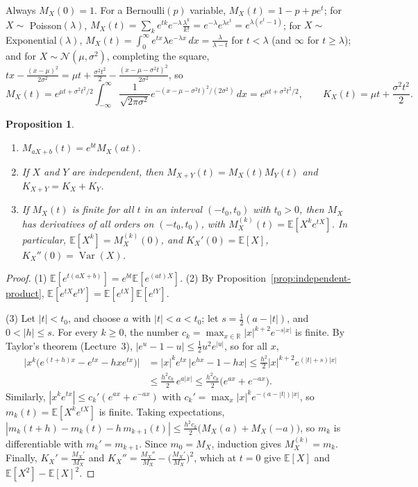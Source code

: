 \documentclass[11pt]{article}
\newcommand{\E}{\mathbb{E}}
\DeclareMathOperator{\Var}{Var}
\theoremstyle{definition}
\theoremstyle{plain}
\newtheorem{proposition}[definition]{Proposition}
\theoremstyle{remark}
\begin{document}
Always $M_X(0) = 1$. For a Bernoulli$(p)$ variable, $M_X(t) = 1 - p + pe^t$; for $X \sim$ Poisson$(\lambda)$, $M_X(t) = \sum_k e^{tk}e^{-\lambda}\frac{\lambda^k}{k!} = e^{-\lambda}e^{\lambda e^t} = e^{\lambda(e^t - 1)}$; for $X \sim$ Exponential$(\lambda)$, $M_X(t) = \int_0^\infty e^{tx}\lambda e^{-\lambda x}\, dx = \frac{\lambda}{\lambda - t}$ for $t < \lambda$ (and $\infty$ for $t \geq \lambda$); and for $X \sim \mathcal{N}(\mu, \sigma^2)$, completing the square, $tx - \frac{(x - \mu)^2}{2\sigma^2} = \mu t + \frac{\sigma^2t^2}{2} - \frac{(x - \mu - \sigma^2t)^2}{2\sigma^2}$, so
\[M_X(t) = e^{\mu t + \sigma^2t^2/2} \int_{-\infty}^\infty \frac{1}{\sqrt{2\pi\sigma^2}}e^{-(x - \mu - \sigma^2t)^2/(2\sigma^2)}\, dx = e^{\mu t + \sigma^2t^2/2}, \qquad K_X(t) = \mu t + \frac{\sigma^2t^2}{2}.\]

\begin{proposition}\label{prop:mgf}
    \begin{enumerate}
        \item $M_{aX + b}(t) = e^{bt}M_X(at)$.
        \item If $X$ and $Y$ are independent, then $M_{X+Y}(t) = M_X(t)M_Y(t)$ and $K_{X+Y} = K_X + K_Y$.
        \item If $M_X(t)$ is finite for all $t$ in an interval $(-t_0, t_0)$ with $t_0 > 0$, then $M_X$ has derivatives of all orders on $(-t_0, t_0)$, with $M_X^{(k)}(t) = \E[X^ke^{tX}]$. In particular, $\E[X^k] = M_X^{(k)}(0)$, and $K_X'(0) = \E[X]$, $K_X''(0) = \Var(X)$.
    \end{enumerate}
\end{proposition}

\begin{proof}
    (1) $\E[e^{t(aX + b)}] = e^{bt}\E[e^{(at)X}]$. (2) By Proposition~\ref{prop:independent-product}, $\E[e^{tX}e^{tY}] = \E[e^{tX}]\E[e^{tY}]$.

    (3) Let $|t| < t_0$, and choose $a$ with $|t| < a < t_0$; let $s = \frac{1}{2}(a - |t|)$, and $0 < |h| \leq s$. For every $k \geq 0$, the number $c_k = \max_{x \in \mathbb{R}} |x|^{k+2}e^{-s|x|}$ is finite. By Taylor's theorem (Lecture~3), $|e^u - 1 - u| \leq \frac{1}{2}u^2e^{|u|}$, so for all $x$,
    \begin{align*}
        \big|x^k\big(e^{(t+h)x} - e^{tx} - hxe^{tx}\big)\big| &= |x|^ke^{tx}\,\big|e^{hx} - 1 - hx\big| \leq \frac{h^2}{2}|x|^{k+2}e^{(|t| + s)|x|} \\
        &\leq \frac{h^2c_k}{2}\,e^{a|x|} \leq \frac{h^2c_k}{2}\big(e^{ax} + e^{-ax}\big).
    \end{align*}
    Similarly, $|x^ke^{tx}| \leq c_k'(e^{ax} + e^{-ax})$ with $c_k' = \max_x |x|^ke^{-(a - |t|)|x|}$, so $m_k(t) = \E[X^ke^{tX}]$ is finite. Taking expectations, $|m_k(t + h) - m_k(t) - h\,m_{k+1}(t)| \leq \frac{h^2c_k}{2}\big(M_X(a) + M_X(-a)\big)$, so $m_k$ is differentiable with $m_k' = m_{k+1}$. Since $m_0 = M_X$, induction gives $M_X^{(k)} = m_k$. Finally, $K_X' = \frac{M_X'}{M_X}$ and $K_X'' = \frac{M_X''}{M_X} - \big(\frac{M_X'}{M_X}\big)^2$, which at $t = 0$ give $\E[X]$ and $\E[X^2] - \E[X]^2$.
\end{proof}
\end{document}
